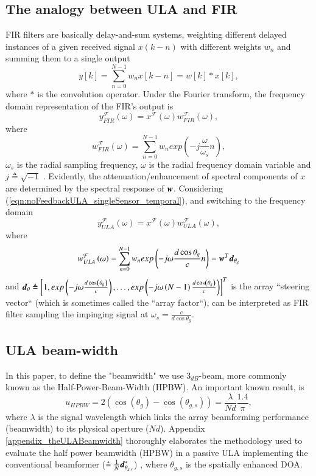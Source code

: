 \subsection*{The analogy between ULA and FIR}
\label{subsec_ULAFIR_analogy}
FIR filters are basically delay-and-sum systems, weighting different delayed instances of a given received signal $x\left(k-n\right)$ with different weights $w_{n}$ and summing them to a single output $$y\left[k\right] = \sum_{n=0}^{N-1}w_{n}x\left[k-n\right] = w\left[k\right]*x\left[k\right],$$ where $*$ is the convolution operator. 
Under the Fourier transform, the frequency domain representation of the FIR's output is $$y_{FIR}^{\mathcal{F}}\left(\omega\right) = x^{\mathcal{F}}\left(\omega\right)w_{FIR}^{\mathcal{F}}\left(\omega\right),$$ where $$ w_{FIR}^{\mathcal{F}}\left(\omega\right) = \sum_{n=0}^{N-1}w_{n}exp\left(-j{}\frac{\omega}{\omega_{s}}n\right),$$ $\omega_{s}$ is the radial sampling frequency, $\omega$ is the radial frequency domain variable and $j \triangleq \sqrt{-1}$ .
Evidently, the attenuation/enhancement of spectral components of $x$ are determined by the spectral response of $\boldsymbol{w}$. 
Considering (\ref{eqn:noFeedbackULA_singleSensor_temporal}), and switching to the frequency domain $$ y_{ULA}^{\mathcal{F}}\left(\omega\right) = x^{\mathcal{F}}\left(\omega\right)w_{ULA}^{\mathcal{F}}\left(\omega\right),$$ where $$ 
w_{ULA}^{\mathcal{F}}\left(\omega\right) = \sum_{n=0}^{N-1}w_{n}exp\left(-j\omega\frac{d\cos{\theta_{g}}}{c}n\right) = \boldsymbol{w}^{T}\boldsymbol{d}_{\theta_{g}} $$ and $\boldsymbol{d}_{\theta} \triangleq \left[1,  exp\left(-j\omega\frac{d\cos\left(\theta_{g}\right)}{c}\right),\hdots,exp\left(-j\omega\left(N-1\right)\frac{d\cos\left(\theta_{g}\right)}{c}\right)\right]^{T} $ is the array ``steering vector`` (which is sometimes called the ``array factor``), can be interpreted as FIR filter sampling the impinging signal at $\omega_{s} = \frac{c}{d\cos{\theta_{g}}}$.
\subsection*{ULA beam-width}
\label{section_arrayPerformance_classicULA}
In this paper, to define the "beamwidth" we use $3_{dB}$-beam, more commonly known as the Half-Power-Beam-Width (HPBW). An important known \cite{VanTrees2002DetectionIV} result, is 
$$
u_{HPBW} = 2\left(\cos\left(\theta_{g}\right)-\cos\left(\theta_{g,s}\right)\right) = \frac{\lambda}{Nd}\frac{1.4}{\pi},
$$
where $\lambda$ is the signal wavelength which links the array beamforming performance (beamwidth) to its physical aperture ($Nd$). 
Appendix \ref{appendix_theULABeamwidth} thoroughly elaborates the methodology used to evaluate the half power beamwidth (HPBW) in a passive ULA implementing the conventional beamformer ($\triangleq \frac{1}{N}\boldsymbol{d}_{\theta_{g,s}}^{*}$) \cite{VanTrees2002DetectionIV}, where $\theta_{g,s}$ is the spatially enhanced DOA.
